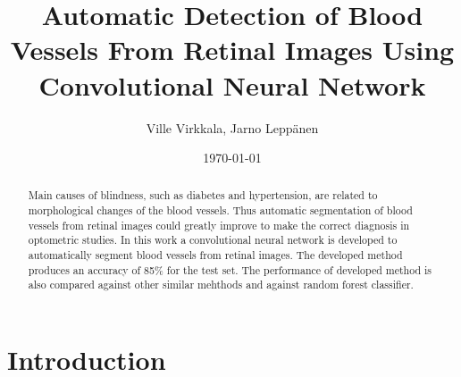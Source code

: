 \documentclass[aps,prb,10pt,twocolumn,groupedaddress]{revtex4-1}
\begin{document}
\title{Automatic Detection of Blood Vessels From Retinal Images Using Convolutional Neural Network }
\date{\today}
\author{Ville Virkkala, Jarno Leppänen}

\begin{abstract}
Main causes of blindness, such as diabetes and hypertension, are related	to morphological changes of the blood vessels. Thus automatic segmentation of blood vessels from retinal images could greatly improve to make the correct diagnosis in
optometric studies. In this work a convolutional neural network is developed to automatically segment blood vessels from retinal images. The developed method produces an accuracy of 85\% for the test set. The performance of developed method is also compared against other similar mehthods and against random forest classifier. 
\end{abstract}

\maketitle

\section{Introduction}
\end{document}
